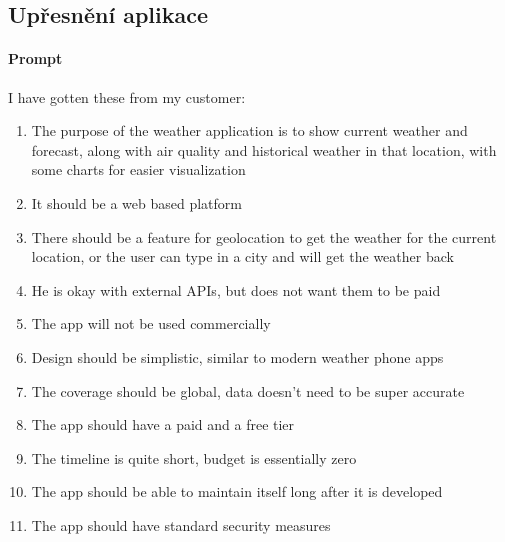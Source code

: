 \documentclass[FM,DP]{tulthesis}
\begin{document}
		\subsection{Upřesnění aplikace}
		\vspace{0.6em}
		\begin{tcolorbox}[colback=white,colframe=black]
			\paragraph{Prompt} 
			I have gotten these from my customer: 
			\begin{enumerate}
				\item The purpose of the weather application is to show current weather and forecast, along with air quality and historical weather in that location, with some charts for easier visualization
				\item It should be a web based platform 
				\item There should be a feature for geolocation to get the weather for the current location, or the user can type in a city and will get the weather back 
				\item He is okay with external APIs, but does not want them to be paid 
				\item The app will not be used commercially 
				\item Design should be simplistic, similar to modern weather phone apps 
				\item The coverage should be global, data doesn't need to be super accurate 
				\item The app should have a paid and a free tier 
				\item The timeline is quite short, budget is essentially zero 
				\item The app should be able to maintain itself long after it is developed 
				\item The app should have standard security measures
			\end{enumerate}
			
			
			\vspace{0.6em}
			

\end{tcolorbox}
\end{document}
